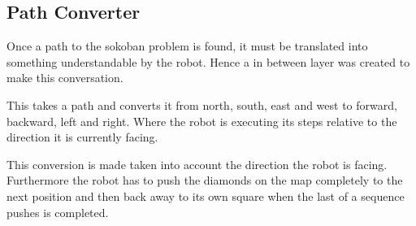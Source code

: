 \subsection{Path Converter}
Once a path to the sokoban problem is found, it must be translated into something understandable by the robot.
Hence a in between layer was created to make this conversation.

This takes a path and converts it from north, south, east and west to forward, backward, left and right.
Where the robot is executing its steps relative to the direction it is currently facing.

This conversion is made taken into account the direction the robot is facing.
Furthermore the robot has to push the diamonds on the map completely to the next position and then back away to its own square when the last of a sequence pushes is completed.